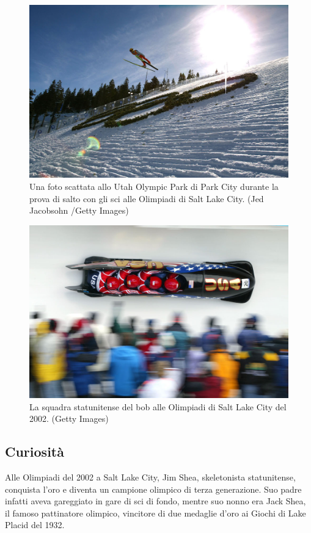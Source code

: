 \documentclass[
]{book}
\begin{document}
\begin{figure}
\includegraphics[width=0.8\linewidth]{images/IlPost/2002(2)} \caption{Una foto scattata allo Utah Olympic Park di Park City durante la prova di salto con gli sci alle Olimpiadi di Salt Lake City. (Jed Jacobsohn /Getty Images)}\label{fig:unnamed-chunk-69}
\end{figure}

\begin{figure}
\includegraphics[width=0.8\linewidth]{images/IlPost/2002(3)} \caption{La squadra statunitense del bob alle Olimpiadi di Salt Lake City del 2002. (Getty Images)}\label{fig:unnamed-chunk-70}
\end{figure}

\subsection*{Curiosità}\label{curiosituxe0-6}

Alle Olimpiadi del 2002 a Salt Lake City, Jim Shea, skeletonista statunitense, conquista l'oro e diventa un campione olimpico di terza generazione. Suo padre infatti aveva gareggiato in gare di sci di fondo, mentre suo nonno era Jack Shea, il famoso pattinatore olimpico, vincitore di due medaglie d'oro ai Giochi di Lake Placid del 1932.
\end{document}
